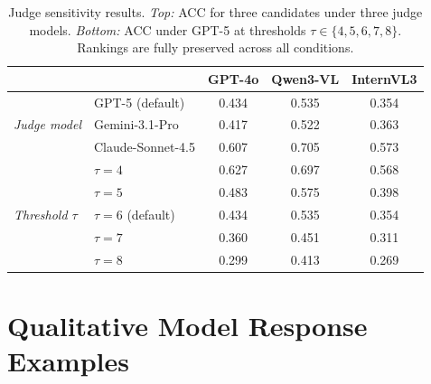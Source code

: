 \documentclass{article} %
\begin{document}
\begin{table}[h]
\centering
\footnotesize
\label{tab:ablation_judge}
\begin{tabular}{@{}llccc@{}}
\toprule
& & \textbf{GPT-4o} & \textbf{Qwen3-VL} & \textbf{InternVL3} \\
\midrule
\multirow{3}{*}{\textit{Judge model}}
  & GPT-5 (default)             & 0.434 & 0.535 & 0.354 \\
  & Gemini-3.1-Pro              & 0.417 & 0.522 & 0.363 \\
  & Claude-Sonnet-4.5           & 0.607 & 0.705 & 0.573 \\
\midrule
\multirow{5}{*}{\textit{Threshold $\tau$}}
  & $\tau=4$           & 0.627 & 0.697 & 0.568 \\
  & $\tau=5$           & 0.483 & 0.575 & 0.398 \\
  & $\tau=6$ (default) & 0.434 & 0.535 & 0.354 \\
  & $\tau=7$           & 0.360 & 0.451 & 0.311 \\
  & $\tau=8$           & 0.299 & 0.413 & 0.269 \\
\bottomrule
\end{tabular}
\caption{%
  Judge sensitivity results.
  \textit{Top:} ACC for three candidates under three judge models.
  \textit{Bottom:} ACC under GPT-5 at thresholds $\tau \in \{4,5,6,7,8\}$.
  Rankings are fully preserved across all conditions.
}
\end{table}

\section{Qualitative Model Response Examples}
\label{app:qualitative}
\end{document}
